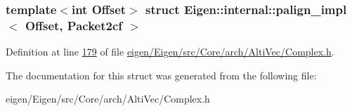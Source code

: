 \subsubsection*{template$<$int Offset$>$\newline
struct Eigen\+::internal\+::palign\+\_\+impl$<$ Offset, Packet2cf $>$}



Definition at line \hyperlink{eigen_2_eigen_2src_2_core_2arch_2_alti_vec_2_complex_8h_source_l00179}{179} of file \hyperlink{eigen_2_eigen_2src_2_core_2arch_2_alti_vec_2_complex_8h_source}{eigen/\+Eigen/src/\+Core/arch/\+Alti\+Vec/\+Complex.\+h}.



The documentation for this struct was generated from the following file\+:\begin{DoxyCompactItemize}
\item 
eigen/\+Eigen/src/\+Core/arch/\+Alti\+Vec/\+Complex.\+h\end{DoxyCompactItemize}
